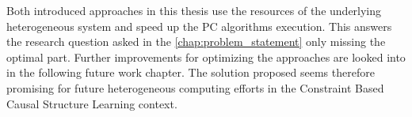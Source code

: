 Both introduced approaches in this thesis use the resources of the underlying heterogeneous system and speed up the PC algorithms execution. This answers the research question asked in the \ref{chap:problem_statement} only missing the optimal part. Further improvements for optimizing the approaches are looked into in the following future work chapter. The solution proposed seems therefore promising for future heterogeneous computing efforts in the Constraint Based Causal Structure Learning context.
% 
% 
% 
% 
% 
% 